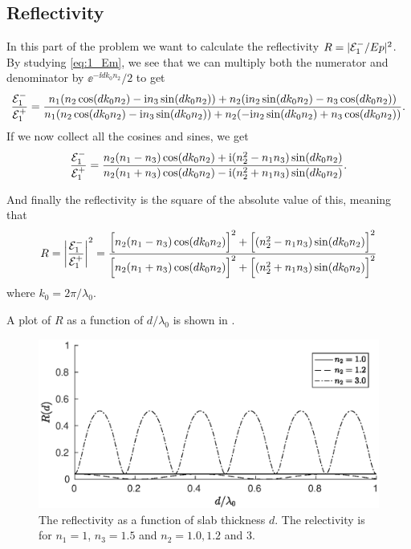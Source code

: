 \documentclass[11pt,letter, swedish, english
]{article}
\begin{document}
\subsection{Reflectivity}
In this part of the problem we want to calculate the reflectivity
$R=|{\mathcal{E}_1^-}/Ep|^2$. By studying \eqref{eq:1_Em}, we see that we can
multiply both the numerator and denominator by $\ee^{-\ii dk_0n_2}/2$ to
get
\begin{equation}
\frac{{\mathcal{E}_1^-}}{{\mathcal{E}_1^+}}=
\frac{
n_1 (n_2\cos(dk_0n_2) -\mathrm{i} n_3\sin(dk_0n_2)) + 
 n_2 (\mathrm{i} n_2\sin(dk_0n_2) - n_3\cos(dk_0n_2))
}{
n_1 (n_2\cos(dk_0n_2) - \mathrm{i} n_3\sin(dk_0n_2)) + 
 n_2 (-\mathrm{i} n_2\sin(dk_0n_2) + n_3\cos(dk_0n_2))
}.
\end{equation}
If we now collect all the cosines and sines, we get
\begin{equation}
\frac{{\mathcal{E}_1^-}}{{\mathcal{E}_1^+}}=\frac{
n_2(n_1-n_3)\cos(dk_0n_2) +\mathrm{i}(n_2^2 -n_1n_3)\sin(dk_0n_2)
}{
n_2(n_1 +n_3)\cos(dk_0n_2) - \mathrm{i}(n_2^2 +n_1n_3)\sin(dk_0n_2) 
}.
\end{equation}

And finally the reflectivity is the square of the absolute value of
this, meaning that
\begin{equation}
R = \abs{\frac{{\mathcal{E}_1^-}}{{\mathcal{E}_1^+}}}^2=
\frac{
\Big[n_2(n_1-n_3)\cos(dk_0n_2)\Big]^2 
+\Big[(n_2^2 -n_1n_3)\sin(dk_0n_2)\Big]^2
}{
\Big[n_2(n_1 +n_3)\cos(dk_0n_2)\Big]^2 
+\Big[(n_2^2 +n_1n_3)\sin(dk_0n_2)\Big]^2 
}
\end{equation}
where $k_0=2\pi/\lambda_0$.

A plot of $R$ as a function of $d/\lambda_0$ is shown in
. 


\begin{figure}
\centering
\includegraphics[width=.9\textwidth]{1a_R.eps}
\caption{The reflectivity as a function of slab thickness $d$. The
  relectivity is for $n_1=1$, $n_3=1.5$ and $n_2=1.0, 1.2$ and 3.}
\label{fig:1a_R}
\end{figure}
\end{document}
